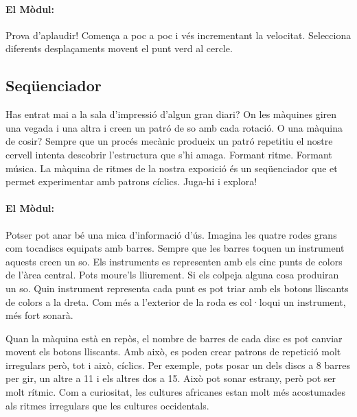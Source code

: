%
%

\paragraph{El Mòdul:}
Prova d'aplaudir! Comença a poc a poc i vés incrementant la velocitat. Selecciona diferents desplaçaments movent el punt verd al cercle.


\subsection{Seqüenciador}
Has entrat mai a la sala d'impressió d'algun gran diari?
On les màquines giren una vegada i una altra i creen un patró de so amb cada rotació. O una màquina de cosir? Sempre que un procés mecànic produeix un patró repetitiu el nostre cervell intenta descobrir l'estructura que s'hi amaga. Formant ritme. Formant música. La màquina de ritmes de la nostra exposició és un seqüenciador que et permet experimentar amb patrons cíclics. Juga-hi i explora!

\paragraph{El Mòdul:}
Potser pot anar bé una mica d'informació d'ús. Imagina les quatre rodes grans com tocadiscs equipats amb barres. Sempre que les barres toquen un instrument aquests creen un so. Els instruments es representen amb els cinc punts de colors de l'àrea central. Pots moure'ls lliurement. Si els colpeja alguna cosa produiran un so. Quin instrument representa cada punt es pot triar amb els botons lliscants de colors a la dreta. Com més a l'exterior de la roda es col·loqui un instrument, més fort sonarà.

Quan la màquina està en repòs, el nombre de barres de cada disc es pot canviar movent els botons lliscants. Amb això, es poden crear patrons de repetició molt irregulars però, tot i això, cíclics. Per exemple, pots posar un dels discs a 8 barres per gir, un altre a 11 i els altres dos a 15. Això pot sonar estrany, però pot ser molt rítmic. Com a curiositat, les cultures africanes estan molt més acostumades als ritmes irregulars que les cultures occidentals.

